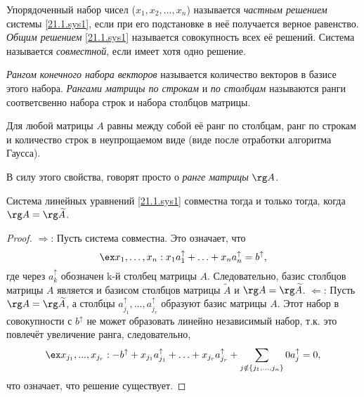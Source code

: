   \begin{defn}
  Упорядоченный набор чисел ($x_1, x_2, \ldots, x_n$) называется \textit{частным решением} системы \eqref{21.1.sys1}, если при его подстановке в неё получается верное равенство. \textit{Общим решением} \eqref{21.1.sys1} называется совокупность всех её решений. Система называется \textit{совместной}, если имеет хотя одно решение.
  \end{defn}
  \begin{defn}
  \textit{Рангом конечного набора векторов} называется количество векторов в базисе этого набора. \textit{Рангами матрицы по строкам} и \textit{по столбцам} называются ранги соответсвенно набора строк и набора столбцов матрицы.
  \end{defn}
  \begin{lemm} 
  Для любой матрицы $A$ равны между собой её ранг по столбцам, ранг по строкам и количество строк в неупрощаемом виде (виде после отработки алгоритма Гаусса).
  \end{lemm}
  В силу этого свойства, говорят просто о \textit{ранге матрицы} $\rg A$.
  \begin{thm}
  Система линейных уравнений \eqref{21.1.sys1} совместна тогда и только тогда, когда $\rg A = \rg \widetilde A$.
  \end{thm}
  \begin{proof}
  $\Rightarrow$: Пусть система совместна. Это означает, что
  \begin{equation*}
  \ex x_1,\ldots, x_n: x_1a_1^\uparrow +\ldots+x_na_n^\uparrow=b^\uparrow,
  \end{equation*}
  где через $a_k^\uparrow$ обозначен k-й столбец матрицы $A$. Следовательно, базис столбцов матрицы $A$  является и базисом столбцов матрицы $\widetilde A$ и $\rg A = \rg \widetilde A$.
  $\Leftarrow$: Пусть $\rg A = \rg \widetilde A$, а столбцы $a_{j_1}^\uparrow,...,a_{j_r}^\uparrow$ образуют базис матрицы $A$. Этот набор в совокупности с $b^\uparrow$ не может образовать линейно независимый набор, т.к. это повлечёт увеличение ранга, следовательно, 
  \begin{equation*}\\ 
  \ex x_{j_1},...,x_{j_r}: -b^\uparrow+x_{j_1}a_{j_1}^\uparrow+\ldots+x_{j_r}a_{j_r}^\uparrow+\sum_{j \notin \{j_1,...,j_n\}}0 a_j^\uparrow = 0,
  \end{equation*} 
  что означает, что решение существует.
  \end{proof}

